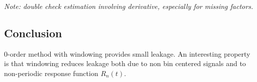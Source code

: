 \documentclass[12pt]{article}
\begin{document}
{\em Note: double check estimation involving derivative, especially for missing factors.}

\subsection{Conclusion}
$0$-order method with windowing provides small leakage. An interesting property is that
windowing reduces leakage both due to non bin centered signals and to non-periodic response function
$R_n(t)$.
\end{document}
